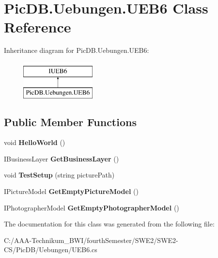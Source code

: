 \hypertarget{class_pic_d_b_1_1_uebungen_1_1_u_e_b6}{}\section{Pic\+D\+B.\+Uebungen.\+U\+E\+B6 Class Reference}
\label{class_pic_d_b_1_1_uebungen_1_1_u_e_b6}
Inheritance diagram for Pic\+D\+B.\+Uebungen.\+U\+E\+B6\+:\begin{figure}[H]
\begin{center}
\leavevmode
\includegraphics[height=2.000000cm]{class_pic_d_b_1_1_uebungen_1_1_u_e_b6}
\end{center}
\end{figure}
\subsection*{Public Member Functions}
\begin{DoxyCompactItemize}
\item 
\mbox{\label{class_pic_d_b_1_1_uebungen_1_1_u_e_b6_af1afd0e8594c5b823ff182cbc67cfa09}} 
void {\bfseries Hello\+World} ()
\item 
\mbox{\label{class_pic_d_b_1_1_uebungen_1_1_u_e_b6_a8599f694070b382b588bac950a11d930}} 
I\+Business\+Layer {\bfseries Get\+Business\+Layer} ()
\item 
\mbox{\label{class_pic_d_b_1_1_uebungen_1_1_u_e_b6_a723718271e29f705dfb8f88df7399878}} 
void {\bfseries Test\+Setup} (string picture\+Path)
\item 
\mbox{\label{class_pic_d_b_1_1_uebungen_1_1_u_e_b6_a360380398767338ed8cd5df51779e6b7}} 
I\+Picture\+Model {\bfseries Get\+Empty\+Picture\+Model} ()
\item 
\mbox{\label{class_pic_d_b_1_1_uebungen_1_1_u_e_b6_a9b12bc36d08f4a6def9f80f9f10d9250}} 
I\+Photographer\+Model {\bfseries Get\+Empty\+Photographer\+Model} ()
\end{DoxyCompactItemize}


The documentation for this class was generated from the following file\+:\begin{DoxyCompactItemize}
\item 
C\+:/\+A\+A\+A-\/\+Technikum\+\_\+\+B\+W\+I/fourth\+Semester/\+S\+W\+E2/\+S\+W\+E2-\/\+C\+S/\+Pic\+D\+B/\+Uebungen/U\+E\+B6.\+cs\end{DoxyCompactItemize}
